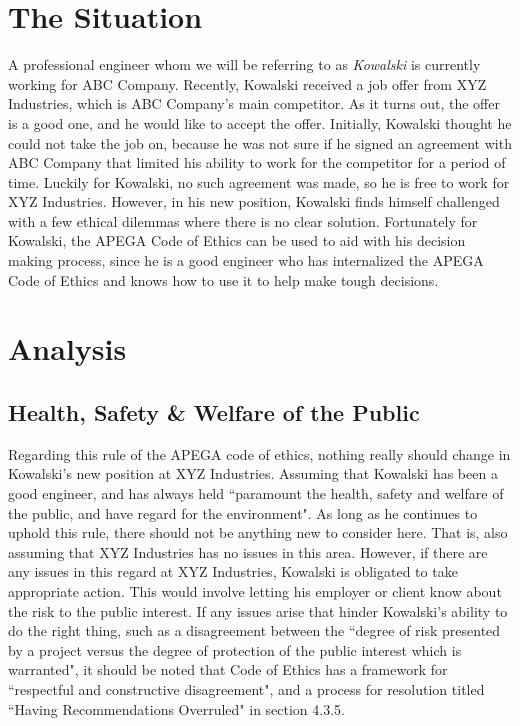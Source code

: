 \documentclass[letterpaper,12pt]{article}
\begin{document}
\section{The Situation}
A professional engineer whom we will be referring to as \textit{Kowalski} is currently working for ABC Company.
Recently, Kowalski received a job offer from XYZ Industries, which is ABC Company's main competitor. As it turns out,
the offer is a good one, and he would like to accept the offer. Initially, Kowalski thought he could not take 
the job on, because he was not sure if he signed an agreement with ABC Company that limited his ability to work for the
competitor for a period of time. Luckily for Kowalski, no such agreement was made, so he is free to work for XYZ Industries.
However, in his new position, Kowalski finds himself challenged with a few ethical dilemmas where there is no clear solution.
Fortunately for Kowalski, the APEGA Code of Ethics can be used to aid with his decision making process, since he is
a good engineer who has internalized the APEGA Code of Ethics and knows how to use it to help make tough decisions.


\section{Analysis}
\subsection{Health, Safety \& Welfare of the Public}
Regarding this rule of the APEGA code of ethics, nothing really should change in Kowalski's new position at XYZ Industries.
Assuming that Kowalski has been a good engineer, and has always held ``paramount the health, safety and welfare of the public, and have regard for the
environment"\cite{apegacode}. As long as he continues to uphold this rule, there should not be anything new to consider here. That is,
also assuming that XYZ Industries has no issues in this area. However, if there are any issues in this regard at XYZ Industries, Kowalski is obligated to take appropriate action.
This would involve letting his employer or client know about the risk to the public interest.
If any issues arise that hinder Kowalski's ability to do the right thing, such as a disagreement between the ``degree of risk presented by a project versus the degree of
protection of the public interest which is warranted"\cite{apegacode}, it should be noted that Code of Ethics has a framework for ``respectful and constructive disagreement", 
and a process for resolution titled ``Having Recommendations Overruled" in section 4.3.5.
\end{document}
